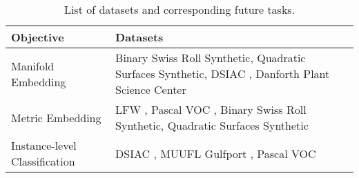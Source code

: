\begin{longtable}{|p{}|p{}|} 
	\caption[List of datasets for future research tasks.]{List of datasets and corresponding future tasks.}
	\label{tab:future_tasks_datasets}\\
	\hline \multicolumn{1}{|p{5cm}|}{\textbf{Objective}} & \multicolumn{1}{p{9cm}|}{\textbf{Datasets}} \\ \hline
	\endfirsthead
    Manifold Embedding & Binary Swiss Roll Synthetic, Quadratic Surfaces Synthetic, DSIAC \citep{DSIACATR}, Danforth Plant Science Center \\
    \hline
    Metric Embedding & LFW \citep{LFW}, Pascal VOC \citep{PASCALVOC}, Binary Swiss Roll Synthetic, Quadratic Surfaces Synthetic \\
    \hline
    Instance-level Classification & DSIAC \citep{DSIACATR}, MUUFL Gulfport \citep{MUUFL}, Pascal VOC \citep{PASCALVOC} \\
    \hline

\end{longtable}

